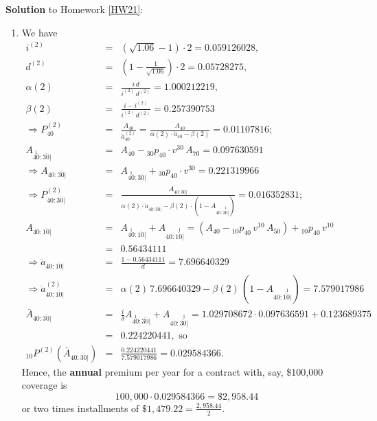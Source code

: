 \documentclass[11pt,fleqn,oneside]{book}
\begin{document}
\noindent \textbf{Solution} to Homework \ref{HW21}:
\footnotesize
\begin{enumerate}
\item We have
\begin{eqnarray*}
i^{(2)} &=& \left(\sqrt{1.06} - 1\right) \cdot 2 = 0.059126028,\\
d^{(2)} &=& \left(1 - \frac{1}{\sqrt{1.06}} \right) \cdot 2 = 0.05728275, \\
\alpha(2) &=& \frac{i\,d}{i^{(2)}\,d^{(2)}} = 1.000212219,\\
\beta(2) &=& \frac{i - i^{(2)}}{i^{(2)}\,d^{(2)}} = 0.257390753\\
\Rightarrow P_{40}^{(2)} &=& \frac{A_{40}}{\ddot{a}^{(2)}_{40}} = \frac{A_{40}}{\alpha(2)\cdot \ddot{a}_{40} - \beta(2)} = 0.01107816;\\
A_{\stackrel{1}{40}:\overline{30}|} &=& A_{40} - {_{30}p_{40}}\cdot v^{30} \, A_{70}
= 0.097630591\\
\Rightarrow A_{40:\overline{30}|} &=& 
A_{\stackrel{1}{40}:\overline{30}|}  + {_{30}p_{40}}\cdot v^{30} = 0.221319966\\
\Rightarrow P_{40:\overline{30}|}^{(2)} &=& \frac{A_{40:\overline{30}|}}{\alpha(2)\cdot \ddot{a}_{40:\overline{30}|}- \beta(2)\cdot \left(1 - A_{40:\stackrel{1}{\overline{30}|}}\right)} = 0.016352831;\\
A_{40:\overline{10}|} &=& A_{\stackrel{1}{40}:{\overline{10}|}} + A_{40:\stackrel{1}{\overline{10}|}} = \left(A_{40} - {_{10}p_{40}}\,v^{10}\,A_{50}\right) + {_{10}p_{40}}\,v^{10} \\
&=& 0.56434111\\
\Rightarrow \ddot{a}_{40:\overline{10}|} &=& \frac{1 - 0.56434111}{d} = 7.696640329\\
\Rightarrow \ddot{a}_{40:\overline{10}|}^{(2)} &=& \alpha(2)\, 7.696640329 - \beta(2)\, \left(1 - A_{40:\stackrel{1}{\overline{10}|}}\right) = 7.579017986\\
\bar{A}_{40:\overline{30}|} &=& \frac{i}{\delta} A_{\stackrel{1}{40}:\overline{30}|} + A_{40:\stackrel{1}{\overline{30}|}} = 1.029708672 \cdot 0.097636591 + 0.123689375 \\
&=& 0.224220441, \text{ so}\\
{_{10}P^{(2)}\left(\bar{A}_{40:\overline{30}|}\right)} &=& \frac{0.224220441}{7.579017986} = 0.029584366.
\end{eqnarray*}
Hence, the \textbf{annual} premium per year for a contract with, say, \$100,000 coverage is
$$
100,000\cdot 0.029584366 = \$2,958.44
$$
or 
two times installments of $\$1,479.22 = \frac{2,958.44}{2}$.

\end{enumerate}
\end{document}
